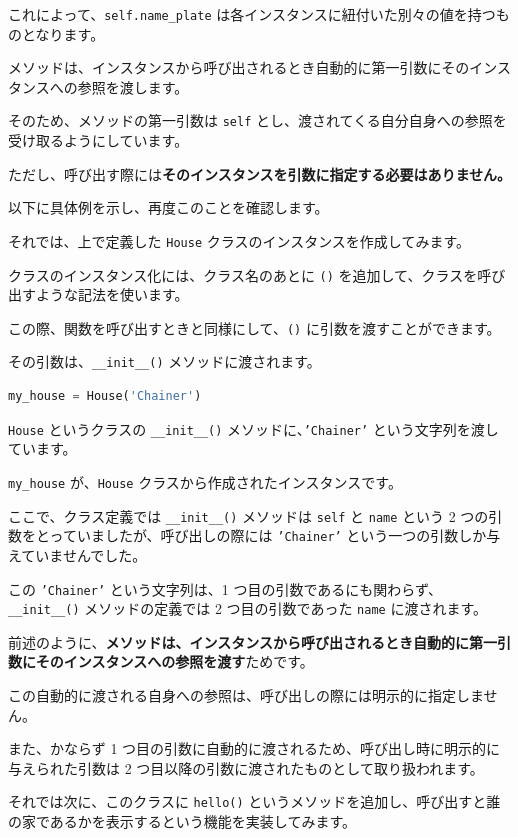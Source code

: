 これによって、\texttt{self.name\_plate} は各インスタンスに紐付いた別々の値を持つものとなります。


メソッドは、インスタンスから呼び出されるとき自動的に第一引数にそのインスタンスへの参照を渡します。

そのため、メソッドの第一引数は \texttt{self} とし、渡されてくる自分自身への参照を受け取るようにしています。

ただし、呼び出す際には\textbf{そのインスタンスを引数に指定する必要はありません。}

以下に具体例を示し、再度このことを確認します。


それでは、上で定義した \texttt{House} クラスのインスタンスを作成してみます。

クラスのインスタンス化には、クラス名のあとに \texttt{()} を追加して、クラスを呼び出すような記法を使います。

この際、関数を呼び出すときと同様にして、\texttt{()} に引数を渡すことができます。

その引数は、\texttt{\_\_init\_\_()} メソッドに渡されます。


\begin{lstlisting}[style=codecell,language=Python]
my_house = House('Chainer')
\end{lstlisting}

\texttt{House} というクラスの \texttt{\_\_init\_\_()} メソッドに、\texttt{'Chainer'} という文字列を渡しています。

\texttt{my\_house} が、\texttt{House} クラスから作成されたインスタンスです。

ここで、クラス定義では \texttt{\_\_init\_\_()} メソッドは \texttt{self} と \texttt{name} という 2 つの引数をとっていましたが、呼び出しの際には \texttt{'Chainer'} という一つの引数しか与えていませんでした。

この \texttt{'Chainer'} という文字列は、1 つ目の引数であるにも関わらず、\texttt{\_\_init\_\_()} メソッドの定義では 2 つ目の引数であった \texttt{name} に渡されます。

前述のように、\textbf{メソッドは、インスタンスから呼び出されるとき自動的に第一引数にそのインスタンスへの参照を渡す}ためです。

この自動的に渡される自身への参照は、呼び出しの際には明示的に指定しません。

また、かならず 1 つ目の引数に自動的に渡されるため、呼び出し時に明示的に与えられた引数は 2 つ目以降の引数に渡されたものとして取り扱われます。


それでは次に、このクラスに \texttt{hello()} というメソッドを追加し、呼び出すと誰の家であるかを表示するという機能を実装してみます。


